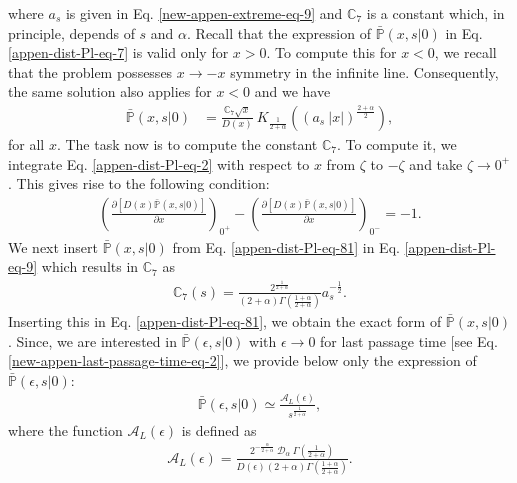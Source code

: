\documentclass[superscriptaddress,amsmath,amssymb,aps,onecolumn]{revtex4}
\begin{document}
where $a_{s}$ is given in Eq. \eqref{new-appen-extreme-eq-9} and $\mathbb{C}_7$ is a constant which, in principle, depends of $s$ and $\alpha$. Recall that the expression of $\bar{\mathbb{P}}(x,s|0)$ in Eq. \eqref{appen-dist-Pl-eq-7} is valid only for $x>0$. To compute this for $x<0$, we recall that the problem possesses $x \to -x$ symmetry in the infinite line. Consequently, the same solution also applies for $x<0$ and we have
\begin{align}
\bar{\mathbb{P}}(x,s|0) & = \frac{\mathbb{C}_7 \sqrt{x}}{D(x)}~K_{\frac{1}{2+\alpha}} \left( (a_{s}~ |x|)^{\frac{2+\alpha}{2}}\right),
\label{appen-dist-Pl-eq-81} 
\end{align}
for all $x$. The task now is to compute the constant $\mathbb{C}_7$. To compute it, we integrate Eq. \eqref{appen-dist-Pl-eq-2} with respect to $x$ from $\zeta$ to $-\zeta$ and take $\zeta \to 0^+$. This gives rise to the following condition:
\begin{align}
\left( \frac{ \partial\left[ D(x) \bar{\mathbb{P}}(x,s|0) \right] }{\partial x} \right)_{ 0^+}-\left( \frac{ \partial\left[ D(x) \bar{\mathbb{P}}(x,s|0) \right] }{\partial x} \right)_{ 0^-}=-1.
\label{appen-dist-Pl-eq-9} 
\end{align}
We next insert $\bar{\mathbb{P}}(x,s|0)$ from Eq. \eqref{appen-dist-Pl-eq-81} in Eq. \eqref{appen-dist-Pl-eq-9} which results in $\mathbb{C}_7$ as
\begin{align}
\mathbb{C}_7(s) = \frac{2^{\frac{1}{2+\alpha}}}{(2+\alpha) \Gamma \left( \frac{1+\alpha}{2+\alpha}\right)} a_s^{-\frac{1}{2}}.
\label{appen-dist-Pl-eq-7}
\end{align}
Inserting this in Eq. \eqref{appen-dist-Pl-eq-81}, we obtain the exact form of $\bar{\mathbb{P}}(x,s|0)$. Since, we are interested in $\bar{\mathbb{P}}(\epsilon, s|0)$ with $\epsilon \to 0$ for last passage time [see Eq. \eqref{new-appen-last-passage-time-eq-2}], we provide below only the expression of $\bar{\mathbb{P}}(\epsilon, s|0)$:
\begin{align}
\bar{\mathbb{P}}(\epsilon, s|0) \simeq \frac{\mathcal{A}_L(\epsilon)}{s^{\frac{1}{2+\alpha}}},
\label{appen-dist-Pl-eq-8}
\end{align}
where the function $\mathcal{A}_L(\epsilon)$ is defined as
\begin{align}
\mathcal{A}_L(\epsilon) =  \frac{2^{-\frac{\alpha}{2+\alpha}}~\mathcal{D}_{\alpha}~ \Gamma \left( \frac{1}{2+\alpha} \right)}{D(\epsilon)(2+\alpha)  \Gamma \left( \frac{1+\alpha}{2+\alpha} \right)}.
\label{appen-dist-Pl-eq-9}
\end{align}
\end{document}
